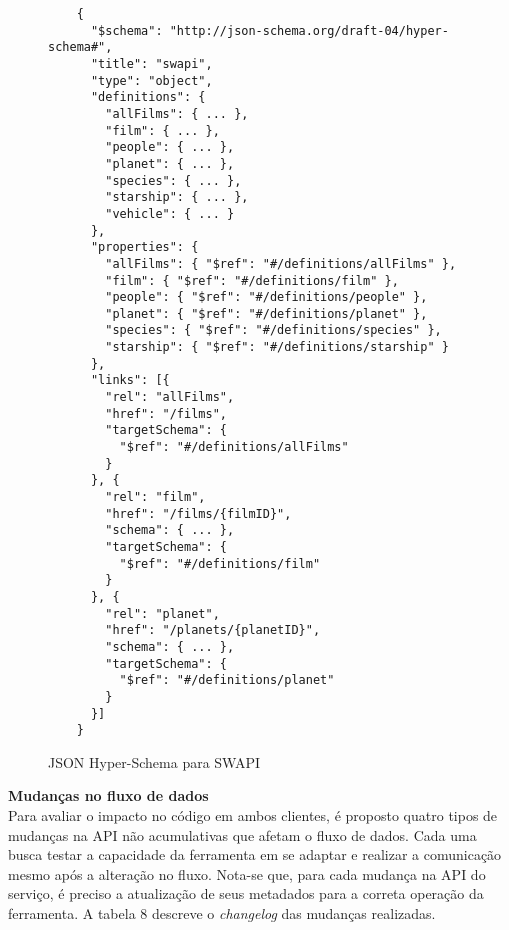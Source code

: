 \begin{figure}[H]
  \centering
  \begin{verbatim}
    {
      "$schema": "http://json-schema.org/draft-04/hyper-schema#",
      "title": "swapi",
      "type": "object",
      "definitions": {
        "allFilms": { ... },
        "film": { ... },
        "people": { ... },
        "planet": { ... },
        "species": { ... },
        "starship": { ... },
        "vehicle": { ... }
      },
      "properties": {
        "allFilms": { "$ref": "#/definitions/allFilms" },
        "film": { "$ref": "#/definitions/film" },
        "people": { "$ref": "#/definitions/people" },
        "planet": { "$ref": "#/definitions/planet" },
        "species": { "$ref": "#/definitions/species" },
        "starship": { "$ref": "#/definitions/starship" }
      },
      "links": [{
        "rel": "allFilms",
        "href": "/films",
        "targetSchema": {
          "$ref": "#/definitions/allFilms"
        }
      }, {
        "rel": "film",
        "href": "/films/{filmID}",
        "schema": { ... },
        "targetSchema": {
          "$ref": "#/definitions/film"
        }
      }, {
        "rel": "planet",
        "href": "/planets/{planetID}",
        "schema": { ... },
        "targetSchema": {
          "$ref": "#/definitions/planet"
        }
      }]
    }
  \end{verbatim}
  \caption{JSON Hyper-Schema para SWAPI}
\end{figure}

\textbf{Mudanças no fluxo de dados} \\

Para avaliar o impacto no código em ambos clientes, é proposto quatro tipos de mudanças na API não acumulativas que afetam o fluxo de dados. Cada uma busca testar a capacidade da ferramenta em se adaptar e realizar a comunicação mesmo após a alteração no fluxo. Nota-se que, para cada mudança na API do serviço, é preciso a atualização de seus metadados para a correta operação da ferramenta. A tabela 8 descreve o \textit{changelog} das mudanças realizadas.

